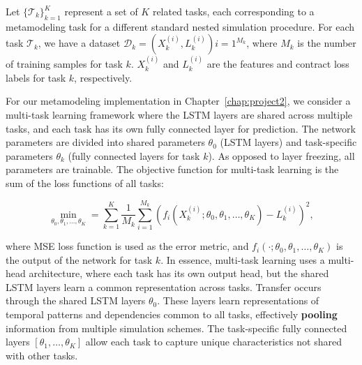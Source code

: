Let $\{\mathcal{T}_k\}_{k=1}^K$ represent a set of $K$ related tasks, each corresponding to a metamodeling task for a different standard nested simulation procedure.
For each task $\mathcal{T}_k$, we have a dataset $\mathcal{D}_k = { (X_k^{(i)}, L_k^{(i)}) }{i=1}^{M_k}$, where $M_k$ is the number of training samples for task $k$.
$X_k^{(i)}$ and $L_k^{(i)}$ are the features and contract loss labels for task $k$, respectively.

For our metamodeling implementation in Chapter~\ref{chap:project2}, we consider a multi-task learning framework where the LSTM layers are shared across multiple tasks, and each task has its own fully connected layer for prediction.
The network parameters are divided into shared parameters $\theta_0$ (LSTM layers) and task-specific parameters $\theta_k$ (fully connected layers for task $k$). 
As opposed to layer freezing, all parameters are trainable.
The objective function for multi-task learning is the sum of the loss functions of all tasks:

\begin{equation} 
    \min_{\theta_0, \theta_1, \dots, \theta_K} = \sum_{k=1}^K \frac{1}{M_k} \sum_{i=1}^{M_k} \left( f_i(X_k^{(i)}; \theta_0, \theta_1, \dots, \theta_K) - L_k^{(i)} \right)^2,
\end{equation}

where MSE loss function is used as the error metric, and $f_i(\cdot; \theta_0, \theta_1, \dots, \theta_K)$ is the output of the network for task $k$.
In essence, multi-task learning uses a multi-head architecture, where each task has its own output head, but the shared LSTM layers learn a common representation across tasks.
Transfer occurs through the shared LSTM layers $\theta_0$. 
These layers learn representations of temporal patterns and dependencies common to all tasks, effectively \textbf{pooling} information from multiple simulation schemes. 
The task-specific fully connected layers $[\theta_1, \dots, \theta_K]$ allow each task to capture unique characteristics not shared with other tasks.


